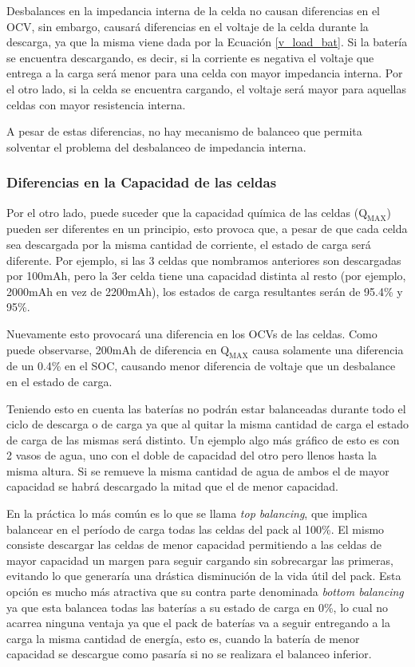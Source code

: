 \documentclass[10pt,a4paper]{article}
\begin{document}
	Desbalances en la impedancia interna de la celda no causan diferencias en el OCV, sin embargo, causará diferencias en el voltaje de la celda durante la descarga, ya que la misma viene dada por la Ecuación \ref{v_load_bat}. Si la batería se encuentra descargando, es decir, si la corriente es negativa el voltaje que entrega a la carga será menor para una celda con mayor impedancia interna. Por el otro lado, si la celda se encuentra cargando, el voltaje será mayor para aquellas celdas con mayor resistencia interna.
	
	A pesar de estas diferencias, no hay mecanismo de balanceo que permita solventar el problema del desbalanceo de impedancia interna.
	
	\subsubsection{Diferencias en la Capacidad de las celdas}
	
	Por el otro lado, puede suceder que la capacidad química de las celdas ($\mathrm{Q_{MAX}}$) pueden ser diferentes en un principio, esto provoca que, a pesar de que cada celda sea descargada por la misma cantidad de corriente, el estado de carga será diferente. Por ejemplo, si las 3 celdas que nombramos anteriores son descargadas por 100mAh, pero la 3er celda tiene una capacidad distinta al resto (por ejemplo, 2000mAh en vez de 2200mAh), los estados de carga resultantes serán de 95.4\% y 95\%.
	
	
	Nuevamente esto provocará una diferencia en los OCVs de las celdas. Como puede observarse, 200mAh de diferencia en $\mathrm{Q_{MAX}}$ causa solamente una diferencia de un 0.4\% en el SOC, causando menor diferencia de voltaje que un desbalance en el estado de carga.
	
	Teniendo esto en cuenta las baterías no podrán estar balanceadas durante todo el ciclo de descarga o de carga ya que al quitar la misma cantidad de carga el estado de carga de las mismas será distinto. Un ejemplo algo más gráfico de esto es con 2 vasos de agua, uno con el doble de capacidad del otro pero llenos hasta la misma altura. Si se remueve la misma cantidad de agua de ambos el de mayor  capacidad se habrá descargado la mitad que el de menor capacidad.
	
	En la práctica lo más común es lo que se llama \emph{top balancing}, que implica balancear en el período de carga todas las celdas del pack al 100\%. El mismo consiste descargar las celdas de menor capacidad permitiendo a las celdas de mayor capacidad un margen para seguir cargando sin sobrecargar las primeras, evitando lo que generaría una drástica disminución de la vida útil del pack. Esta opción es mucho más atractiva que su contra parte denominada \emph{bottom balancing} ya que esta balancea todas las baterías a su estado de carga en 0\%, lo cual no acarrea ninguna ventaja ya que el pack de baterías va a seguir entregando a la carga la misma cantidad de energía, esto es, cuando la batería de menor capacidad se descargue como pasaría si no se realizara el balanceo inferior.
	
\end{document}

